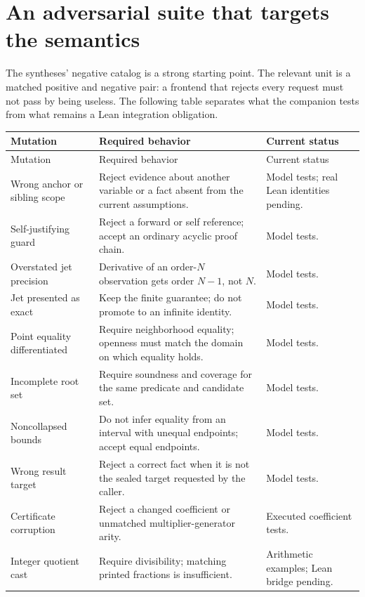 \documentclass[11pt,letterpaper]{article}
\theoremstyle{definition}
\theoremstyle{remark}
\begin{document}
\section{An adversarial suite that targets the semantics}\label{sec:negative}

The syntheses' negative catalog is a strong starting point. The relevant unit
is a matched positive and negative pair: a frontend that rejects every request
must not pass by being useless. The following table separates what the
companion tests from what remains a Lean integration obligation.

\begingroup\small
\begin{longtable}{@{}P{1.4in}P{3.37in}P{1.08in}@{}}
\toprule
Mutation & Required behavior & Current status\\
\midrule\endfirsthead
\toprule Mutation & Required behavior & Current status\\\midrule\endhead
Wrong anchor or sibling scope & Reject evidence about another variable or a fact absent from the current assumptions. & Model tests; real Lean identities pending.\\
Self-justifying guard & Reject a forward or self reference; accept an ordinary acyclic proof chain. & Model tests.\\
Overstated jet precision & Derivative of an order-$N$ observation gets order $N-1$, not $N$. & Model tests.\\
Jet presented as exact & Keep the finite guarantee; do not promote to an infinite identity. & Model tests.\\
Point equality differentiated & Require neighborhood equality; openness must match the domain on which equality holds. & Model tests.\\
Incomplete root set & Require soundness and coverage for the same predicate and candidate set. & Model tests.\\
Noncollapsed bounds & Do not infer equality from an interval with unequal endpoints; accept equal endpoints. & Model tests.\\
Wrong result target & Reject a correct fact when it is not the sealed target requested by the caller. & Model tests.\\
Certificate corruption & Reject a changed coefficient or unmatched multiplier-generator arity. & Executed coefficient tests.\\
Integer quotient cast & Require divisibility; matching printed fractions is insufficient. & Arithmetic examples; Lean bridge pending.\\

\end{longtable}
\end{document}
